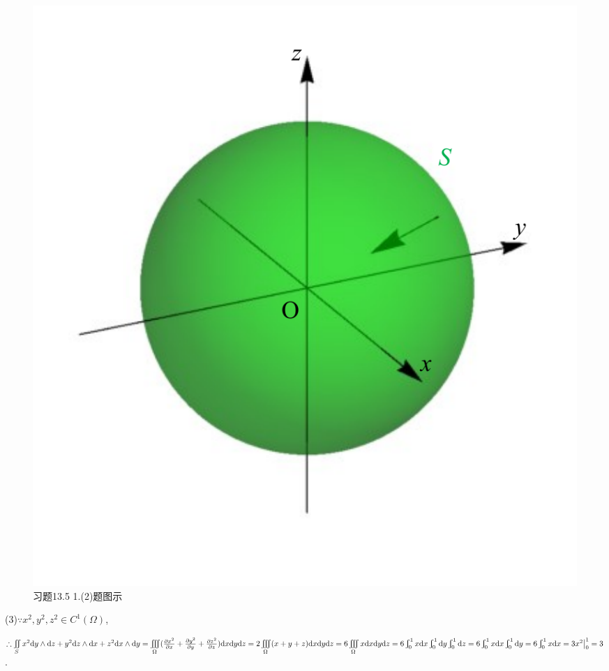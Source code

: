 \documentclass[12pt,UTF8]{ctexart}
\newcommand{\Int}[4]{\varint\nolimits_{#1}^{#2}#3\mathrm d#4}
\newcommand{\varIIInt}[5]{\iiint\limits_{#1}#2\mathrm d#3\mathrm d#4\mathrm d#5}
\newcommand{\md}[1]{\mathrm d#1}
\newcommand{\BSIInt}[2]{\iint\limits_{#1}#2}
\newcommand{\pp}[2]{\frac{\partial #1}{\partial #2}}
\begin{document}
\begin{enumerate}
\begin{figure}[H]
\begin{center}
\includegraphics[height=0.5\textheight]{Figures24/Fig13-5-1-2.pdf}
\end{center}
\caption{习题13.5 1.(2)题图示}
\label{13-5-1-2}
\end{figure}

(3)$\because x^2,y^2,z^2\in C^1(\Omega)$,

$\therefore\BSIInt S{x^2\md y\wedge\md z+y^2\md z\wedge\md x+z^2\md x\wedge\md y}=\varIIInt\Omega{(\pp{x^2}x+\pp{y^2}y+\pp{z^2}z)}xyz\\
=2\varIIInt\Omega{(x+y+z)}xyz=6\varIIInt\Omega xxyz=6\Int01xx\Int01{}y\Int01{}z=6\Int01xx\Int01{}y\\
=6\Int01xx=3x^2\big|_0^1=3$.


\end{enumerate}
\end{document}
